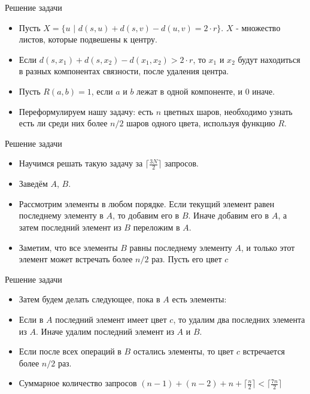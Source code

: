 \begin{frame}[t]{Решение задачи}
	\begin{itemize}
		\item Пусть $X = \{ u $ $|$ $d(s, u) + d(s, v) - d(u, v) = 2 \cdot r \}$. $X$ - множество листов, которые подвешены к центру.
		\item Если $ d(s, x_1) + d(s, x_2) - d(x_1, x_2) > 2 \cdot r $, то $x_1$ и $x_2$ будут находиться в разных компонентах связности, после удаления центра.
		\item Пусть $R(a, b) = 1$, если $a$ и $b$ лежат в одной компоненте, и $0$ иначе.
		\item Переформулируем нашу задачу: есть $n$ цветных шаров, необходимо узнать есть ли среди них более $n/2$ шаров одного цвета, используя функцию $R$. 
	\end{itemize}
\end{frame}
	
	

\begin{frame}[t]{Решение задачи}
	\begin{itemize}
		\item Научимся решать такую задачу за $\lceil \frac{3N}{2} \rceil $ запросов.
		\item Заведём $A$, $B$.
		\item Рассмотрим элементы в любом порядке. Если текущий элемент равен последнему элементу в $A$, то добавим его в $B$. Иначе добавим его в $A$, а затем последний элемент из $B$ переложим в $A$.
		\item Заметим, что все элементы $B$ равны последнему элементу $A$, и только этот элемент может встречать более $n/2$ раз. Пусть его цвет $c$
	\end{itemize}
\end{frame}


\begin{frame}[t]{Решение задачи}
	\begin{itemize}
		\item Затем будем делать следующее, пока в $A$ есть элементы:
		\item Если в $A$ последний элемент имеет цвет $c$, то удалим два последних элемента из $A$. Иначе удалим последний элемент из $A$ и $B$.
		\item Если после всех операций в $B$ остались элементы, то цвет $c$ встречается более $n/2$ раз.
		\item Суммарное количество запросов $(n - 1) + (n - 2) + n + \lceil \frac{n}{2} \rceil < \lceil \frac {7n}{2} \rceil $
	\end{itemize}
\end{frame}
	